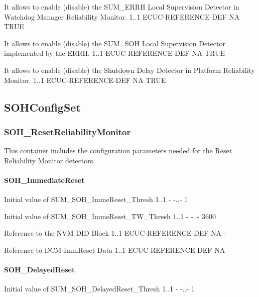 {{{{{{{{{{{
{It allows to enable (disable) the SUM_ERRH Local Supervision Detector in Watchdog Manager Reliability Monitor.}
{1..1}
{ECUC-REFERENCE-DEF}
{NA}
{TRUE}

{
{It allows to enable (disable) the SUM_SOH Local Supervision Detector implemented by the ERRH.}
{1..1}
{ECUC-REFERENCE-DEF}
{NA}
{TRUE}

{
{It allows to enable (disable) the Shutdown Delay Detector in Platform Reliability Monitor.}
{1..1}
{ECUC-REFERENCE-DEF}
{NA}
{TRUE}



\subsection{SOHConfigSet}
\label{subsection:SOHConfigSet}

\subsubsection{SOH\_ResetReliabilityMonitor}
This container includes the configuration parameters needed for the Reset Reliability Monitor detectors.


\paragraph{SOH\_ImmediateReset}
{
{Initial value of SUM_SOH_ImmeReset_Thresh}
{1..1}
{-}
{-..-}
{1}}

{
{Initial value of SUM_SOH_ImmeReset_TW_Thresh}
{1..1}
{-}
{-..-}
{3600}}

{
{Reference to the NVM DID Block}
{1..1}
{ECUC-REFERENCE-DEF}
{NA}
{-}}

{
{Reference to DCM ImmReset Data}
{1..1}
{ECUC-REFERENCE-DEF}
{NA}
{-}}

\paragraph{SOH\_DelayedReset}

{
{Initial value of SUM_SOH_DelayedReset_Thresh}
{1..1}
{-}
{-..-}
{1}}

}}}}}}}}}}}}}
